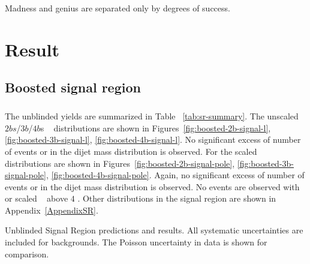 \begin{savequote}[75mm]
Madness and genius are separated only by degrees of success. 
\end{savequote}

\chapter{Result}
\section{Boosted signal region}
\paragraph{}
The unblinded yields are summarized in Table ~\ref{tab:sr-summary}. 
The unscaled $2bs$/$3b$/$4b$s \mtwoJ~ distributions are shown in Figures~\ref{fig:boosted-2b-signal-l}, \ref{fig:boosted-3b-signal-l}, \ref{fig:boosted-4b-signal-l}. No significant excess of number of events or in the dijet mass distribution is observed.
For the scaled \mtwoJ~ distributions are shown in Figures~\ref{fig:boosted-2b-signal-pole}, \ref{fig:boosted-3b-signal-pole}, \ref{fig:boosted-4b-signal-pole}. Again, no significant excess of number of events or in the dijet mass distribution is observed.
No events are observed with \mtwoJ~ or scaled \mtwoJ~ above $4$ \TeV.
Other distributions in the signal region are shown in Appendix~\ref{AppendixSR}.

\begin{table}[htbp!]
\scriptsize
\begin{center}

\caption{Unblinded Signal Region predictions and results. All systematic uncertainties are included for backgrounds. The Poisson uncertainty in data is shown for comparison.}
\label{tab:sr-summary}
\end{center}
\end{table}

